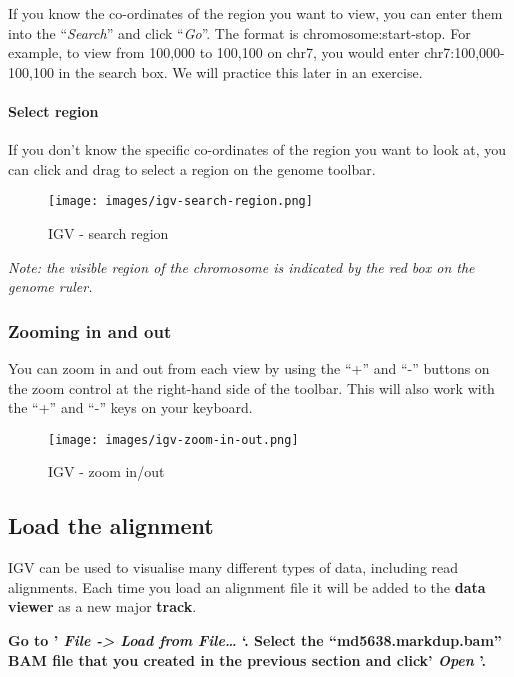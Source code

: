 \documentclass[11pt]{article}
\begin{document}
If you know the co-ordinates of the region you want to view, you can
enter them into the ``\textit{Search}'' and click ``\textit{Go}''. The
format is chromosome:start-stop. For example, to view from 100,000 to
100,100 on chr7, you would enter chr7:100,000-100,100 in the search box.
We will practice this later in an exercise.

    \hypertarget{select-region}{%
\paragraph{Select region}\label{select-region}}

If you don't know the specific co-ordinates of the region you want to
look at, you can click and drag to select a region on the genome
toolbar.

    \begin{figure}
\centering
\texttt{[image: images/igv-search-region.png]}
\caption{IGV - search region}
\end{figure}

    \textit{Note: the visible region of the chromosome is indicated by the red
box on the genome ruler.}

    \hypertarget{zooming-in-and-out}{%
\subsubsection{Zooming in and out}\label{zooming-in-and-out}}

You can zoom in and out from each view by using the ``+'' and ``-''
buttons on the zoom control at the right-hand side of the toolbar. This
will also work with the ``+'' and ``-'' keys on your keyboard.

    \begin{figure}
\centering
\texttt{[image: images/igv-zoom-in-out.png]}
\caption{IGV - zoom in/out}
\end{figure}

    \hypertarget{load-the-alignment}{%
\subsection{Load the alignment}\label{load-the-alignment}}

IGV can be used to visualise many different types of data, including
read alignments. Each time you load an alignment file it will be added
to the \textbf{data viewer} as a new major \textbf{track}.

\textbf{Go to ' \textit{File -\textgreater{} Load from File\ldots{}} `.
Select the ``md5638.markdup.bam'' BAM file that you created in the
previous section and click' \textit{Open} '.}
\end{document}

